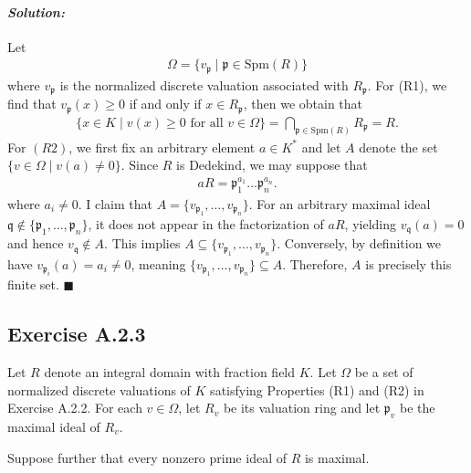 \documentclass[12pt, a4paper]{article}
\newenvironment{solution}
  {\paragraph{\textit{Solution:}}\par\medskip}
  {\hfill$\blacksquare$\vspace{0.1cm}}
\begin{document}
\begin{solution}
    Let 
    \begin{align*}
        \Omega = \{v_{\mathfrak{p}} \mid \mathfrak{p} \in \text{Spm}(R)\}
    \end{align*}
    where $v_{\mathfrak{p}}$ is the normalized discrete valuation associated with $R_{\mathfrak{p}}$.
    For (R1), we find that $v_{\mathfrak{p}}(x)\ge 0$ if and only if $x\in R_{\mathfrak{p}}$, then we obtain that
    \begin{align*}
        \{x \in K \mid v(x) \geq 0 \text{ for all } v \in \Omega\} = \bigcap_{\mathfrak{p}\in\text{Spm}(R)}R_{\mathfrak{p}} = R.
    \end{align*}
    For $(R2)$, we first fix an arbitrary element $a\in K^*$ and let $A$ denote the set $\{v \in \Omega \mid v(a) \neq 0\}$.
    Since $R$ is Dedekind, we may suppose that 
    \begin{align*}
        aR = \mathfrak{p}_1^{a_1}\dots \mathfrak{p}_n^{a_n}.
    \end{align*}
    where $a_i\neq 0$.
    I claim that $A = \{v_{\mathfrak{p}_1}, \dots, v_{\mathfrak{p}_n}\}$. For an arbitrary maximal ideal $\mathfrak{q} \notin \{\mathfrak{p}_1, \dots, \mathfrak{p}_n\}$, it does not appear in the factorization of $aR$, yielding $v_{\mathfrak{q}}(a) = 0$ and hence $v_{\mathfrak{q}} \notin A$. This implies $A \subseteq \{v_{\mathfrak{p}_1}, \dots, v_{\mathfrak{p}_n}\}$. Conversely, by definition we have $v_{\mathfrak{p}_i}(a) = a_i \neq 0$, meaning $\{v_{\mathfrak{p}_1}, \dots, v_{\mathfrak{p}_n}\} \subseteq A$. 
    Therefore, $A$ is precisely this finite set. 
\end{solution}

\subsection*{Exercise A.2.3}
Let $R$ denote an integral domain with fraction field $K$. Let $\Omega$ be a set of normalized discrete valuations of $K$ satisfying Properties (R1) and (R2) in Exercise A.2.2. For each $v \in \Omega$, let $R_v$ be its valuation ring and let $\mathfrak{p}_v$ be the maximal ideal of $R_v$.

Suppose further that every nonzero prime ideal of $R$ is maximal.
\end{document}
